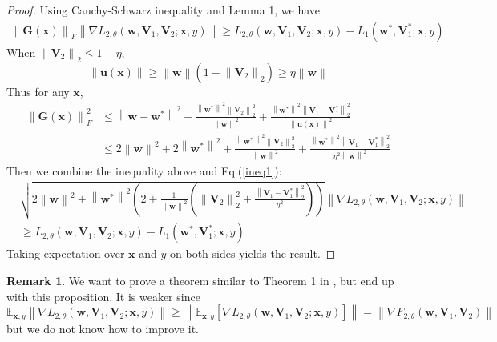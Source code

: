 \documentclass{article}
\theoremstyle{plain}
\theoremstyle{definition}
\newtheorem{rem}{Remark}
\newcommand{\norm}[1]{\left\lVert#1\right\rVert}
\begin{document}
\begin{proof}
	Using Cauchy-Schwarz inequality and Lemma 1, we have
	\begin{align}
	\norm{\mathbf{G}(\mathbf{x})}_F\norm{\nabla L_{2,\theta}(\mathbf{w},\mathbf{V}_1,\mathbf{V}_2;\mathbf{x},y)}\geq L_{2,\theta}(\mathbf{w},\mathbf{V}_1,\mathbf{V}_2;\mathbf{x},y)-L_1(\mathbf{w}^*,\mathbf{V}_1^*;\mathbf{x},y)
	\label{ineq1}
	\end{align}
	When $\norm{\mathbf{V}_2}_2\leq 1-\eta$,
	\[\norm{\mathbf{u}(\mathbf{x})}\geq \norm{\mathbf{w}}\left(1-\norm{\mathbf{V}_2}_2\right)\geq\eta\norm{\mathbf{w}}\]
	Thus for any $\mathbf{x}$,
	\begin{align*}
	\norm{\mathbf{G}(\mathbf{x})}_F^2&\leq\norm{\mathbf{w}-\mathbf{w}^*}^2+\frac{\norm{\mathbf{w^*}}^2\norm{\mathbf{V}_2}_2^2}{\norm{\mathbf{w}}^2}+\frac{\norm{\mathbf{w^*}}^2\norm{\mathbf{V}_1-\mathbf{V}_1^*}_2^2}{\norm{\mathbf{u}(\mathbf{x})}^2}\\
	&\leq2\norm{\mathbf{w}}^2+2\norm{\mathbf{w}^*}^2+\frac{\norm{\mathbf{w}^*}^2\norm{\mathbf{V}_2}_2^2}{\norm{\mathbf{w}}^2}+\frac{\norm{\mathbf{w^*}}^2\norm{\mathbf{V}_1-\mathbf{V}_1^*}_2^2}{\eta^2\norm{\mathbf{w}}^2}
	\end{align*}
	Then we combine the inequality above and Eq.(\ref{ineq1}):
	\begin{align*}
	&\sqrt{2\norm{\mathbf{w}}^2+\norm{\mathbf{w}^*}^2\left(2+\frac{1}{\norm{\mathbf{w}}^2}\left(\norm{\mathbf{V}_2}_2^2+\frac{\norm{\mathbf{V}_1-\mathbf{V}_1^*}_2^2}{\eta^2}\right)\right)}\norm{\nabla L_{2,\theta}(\mathbf{w},\mathbf{V}_1,\mathbf{V}_2;\mathbf{x},y)}\\
	&\geq L_{2,\theta}(\mathbf{w},\mathbf{V}_1,\mathbf{V}_2;\mathbf{x},y)-L_1(\mathbf{w}^*,\mathbf{V}_1^*;\mathbf{x},y)
	\end{align*}
	Taking expectation over $\mathbf{x}$ and $y$ on both sides yields the result.
\end{proof}

\begin{rem}
	We want to prove a theorem similar to Theorem 1 in \cite{2018arXiv180406739S}, but end up with this proposition. It is weaker since
	\[\mathbb{E}_{\mathbf{x},y}\norm{\nabla L_{2,\theta}(\mathbf{w},\mathbf{V}_1,\mathbf{V}_2;\mathbf{x},y)}\geq\norm{\mathbb{E}_{\mathbf{x},y}\left[\nabla L_{2,\theta}(\mathbf{w},\mathbf{V}_1,\mathbf{V}_2;\mathbf{x},y)\right]}=\norm{\nabla F_{2,\theta}(\mathbf{w},\mathbf{V}_1,\mathbf{V}_2)}\]
	but we do not know how to improve it.
\end{rem}
\end{document}
